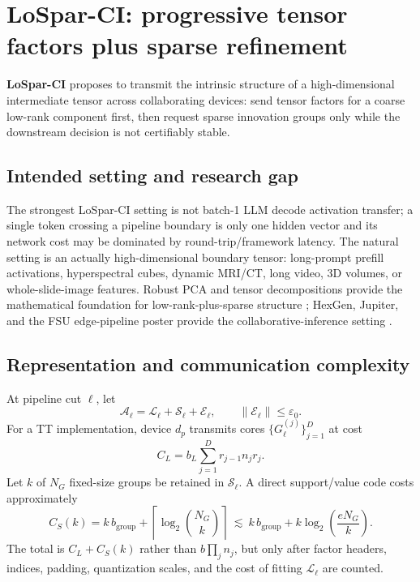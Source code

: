 \documentclass[10pt]{article}
\newcommand{\norm}[1]{\left\lVert #1\right\rVert}
\begin{document}
\section{LoSpar-CI: progressive tensor factors plus sparse refinement}

\begin{methodbox}[title={Proposed cross-domain technique}]
\textbf{LoSpar-CI} proposes to transmit the intrinsic structure of a high-dimensional intermediate
tensor across collaborating devices: send tensor factors for a coarse low-rank component first,
then request sparse innovation groups only while the downstream decision is not certifiably stable.
\end{methodbox}

\subsection{Intended setting and research gap}

The strongest LoSpar-CI setting is not batch-1 LLM decode activation transfer; a single token
crossing a pipeline boundary is only one hidden vector and its network cost may be dominated by
round-trip/framework latency. The natural setting is an actually high-dimensional boundary tensor:
long-prompt prefill activations, hyperspectral cubes, dynamic MRI/CT, long video, 3D volumes, or
whole-slide-image features. Robust PCA and tensor decompositions provide the mathematical
foundation for low-rank-plus-sparse structure \cite{rpca,kolda,tt}; HexGen, Jupiter, and the
FSU edge-pipeline poster provide the collaborative-inference setting
\cite{hexgen,jupiter,poster}.

\subsection{Representation and communication complexity}

At pipeline cut $\ell$, let
\[
\mathcal A_\ell=\mathcal L_\ell+\mathcal S_\ell+\mathcal E_\ell,\qquad
\norm{\mathcal E_\ell}\le\varepsilon_0.
\]
For a TT implementation, device $d_p$ transmits cores
$\{G_\ell^{(j)}\}_{j=1}^{D}$ at cost
\[
C_L=b_L\sum_{j=1}^{D}r_{j-1}n_jr_j .
\]
Let $k$ of $N_G$ fixed-size groups be retained in $\mathcal S_\ell$. A direct support/value
code costs approximately
\[
C_S(k)=k\,b_{\mathrm{group}}+
\left\lceil\log_2 \binom{N_G}{k}\right\rceil
\ \lesssim\ k\,b_{\mathrm{group}}+
k\log_2\!\left(\frac{eN_G}{k}\right).
\]
The total is $C_L+C_S(k)$ rather than $b\prod_jn_j$, but only after factor headers, indices,
padding, quantization scales, and the cost of fitting $\mathcal L_\ell$ are counted.
\end{document}

